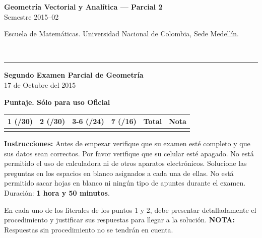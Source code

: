 \documentclass[11pt]{article}
\newcommand{\examheader}{%
  \noindent
  \begin{minipage}[t]{0.6\linewidth}
    {\small\bfseries Geometría Vectorial y Analítica --- Parcial 2}\\
    {\small Semestre 2015--02}
  \end{minipage}%
  \hfill
  \begin{minipage}[t]{0.35\linewidth}
    \raggedleft\small Escuela de Matemáticas. Universidad Nacional de Colombia, Sede Medellín.
  \end{minipage}\\[2pt]
  \rule{\linewidth}{0.6pt}
}
\begin{document}
\examheader

\begin{center}
{\bfseries Segundo Examen Parcial de Geometría}\\
17 de Octubre del 2015

\vspace{4pt}
\textbf{Puntaje. Sólo para uso Oficial}

\vspace{2pt}
\begin{tabular}{|c|c|c|c|c|c|}
\hline
1 (/30) & 2 (/30) & 3-6 (/24) & 7 (/16) & Total & Nota\\
\hline
 & & & & & \\
\hline
\end{tabular}
\end{center}

\textbf{Instrucciones:} Antes de empezar verifique que su examen esté completo y que sus datos sean correctos. Por favor verifique que su celular esté apagado. No está permitido el uso de calculadora ni de otros aparatos electrónicos. Solucione las preguntas en los espacios en blanco asignados a cada una de ellas. No está permitido sacar hojas en blanco ni ningún tipo de apuntes durante el examen. Duración: \textbf{1 hora y 50 minutos}.

\vspace{10pt}

En cada uno de los literales de los puntos 1 y 2, debe presentar detalladamente el procedimiento y justificar sus respuestas para llegar a la solución. \textbf{NOTA:} Respuestas sin procedimiento no se tendrán en cuenta.
\end{document}
